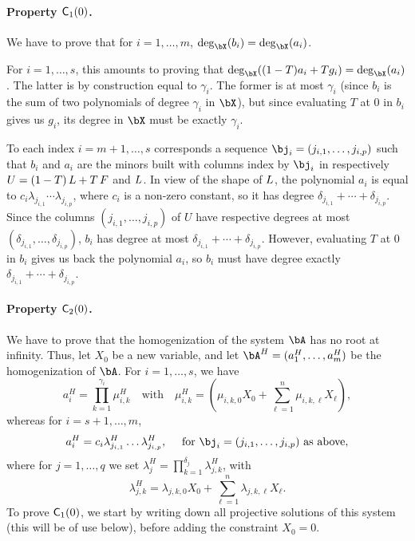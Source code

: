 \documentclass[12pt]{article}
\begin{document}
\paragraph{Property $\mathsf{C}_1(0)$.} We have to prove that for $i=1,\dots,m$,
$\deg_\bX(b_i)=\deg_\bX(a_i)$. 

For $i=1,\dots,s$, this amounts to proving that $\deg_\bX((1-T) a_i +
T g_i)=\deg_\bX(a_i)$. The latter is by construction equal to
$\gamma_i$. The former is at most $\gamma_i$ (since $b_i$ is the sum
of two polynomials of degree $\gamma_i$ in $\bX$), but since
evaluating $T$ at $0$ in $b_i$ gives us $g_i$, its degree in $\bX$
must be exactly $\gamma_i$.

To each index $i=m+1,\dots,s$ corresponds a sequence
$\bj_i=(j_{i,1},\dots,j_{i,p})$ such that $b_i$ and $a_i$ are the
minors built with columns index by $\bj_i$ in respectively
${U}=(1-T)\, {L} + T \, {F}$ and ${L}$. In view of the shape of ${L}$,
the polynomial $a_i$ is equal to $c_i\lambda_{j_{i,1}}\cdots
\lambda_{j_{i,p}}$, where $c_i$ is a non-zero constant, so it has degree
$\delta_{j_{i,1}} + \cdots + \delta_{j_{i,p}}$.  Since the columns
$(j_{i,1},\dots,j_{i,p})$ of $U$ have respective degrees at most
$(\delta_{j_{i,1}},\dots,\delta_{j_{i,p}})$, $b_i$ has degree at most
$\delta_{j_{i,1}} + \cdots + \delta_{j_{i,p}}$. However, evaluating
$T$ at $0$ in $b_i$ gives us back the polynomial $a_i$, so $b_i$ must
have degree exactly $\delta_{j_{i,1}} + \cdots + \delta_{j_{i,p}}$.

\paragraph{Property $\mathsf{C}_2(0)$.} We have to prove that the homogenization
of the system $\bA$ has no root at infinity. Thus, let $X_0$ be a new
variable, and let $\bA^H=(a_1^H,\dots,a_m^H)$ be the homogenization
of $\bA$. For $i=1,\dots,s$, we have
$$a_i^H=\prod_{k=1}^{\gamma_i} \mu^H_{i,k} \quad\text{with}\quad \mu^H_{i,k}=(\mu_{i,k,0}X_0 + \sum_{\ell = 1}^{n}\mu_{i,k,\ell}X_\ell),$$
whereas for $i=s+1,\dots,m$, 
$$a_i^H=c_i \lambda^H_{j_{i,1}}\ldots \lambda^H_{j_{i,p}}, \quad \text{~for~} \bj_i=(j_{i,1},\dots,j_{i,p}) \text{~as above},$$
where for $j=1,\dots,q$ we set 
$\lambda^H_j = \prod_{k=1}^{\delta_j}\lambda^H_{j,k}$,
with
$$\lambda^H_{j,k}=\lambda_{j,k,0}X_0 + \sum_{\ell = 1}^{n}\lambda_{j,k,\ell}X_\ell.$$
To prove  $\mathsf{C}_1(0)$, we start by writing down all projective
solutions of this system (this will be of use below), before adding
the constraint $X_0=0$.
\end{document}
